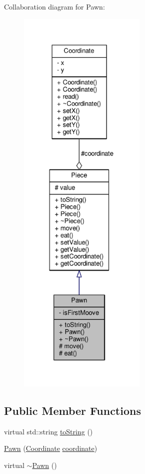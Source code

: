Collaboration diagram for Pawn\+:\nopagebreak
\begin{figure}[H]
\begin{center}
\leavevmode
\includegraphics[height=550pt]{class_pawn__coll__graph}
\end{center}
\end{figure}
\subsection*{Public Member Functions}
\begin{DoxyCompactItemize}
\item 
virtual std\+::string \hyperlink{class_pawn_afac4abaf92106777e20d21fde635ffc4}{to\+String} ()
\item 
\hyperlink{class_pawn_a28054ee4fa72e69892be4d250191aa22}{Pawn} (\hyperlink{class_coordinate}{Coordinate} \hyperlink{class_piece_a9e92373c8fffc1f5efb20d62204b70cf}{coordinate})
\item 
virtual \hyperlink{class_pawn_a3095938fb8326469c3bd05da0b8f50af}{$\sim$\+Pawn} ()
\end{DoxyCompactItemize}
